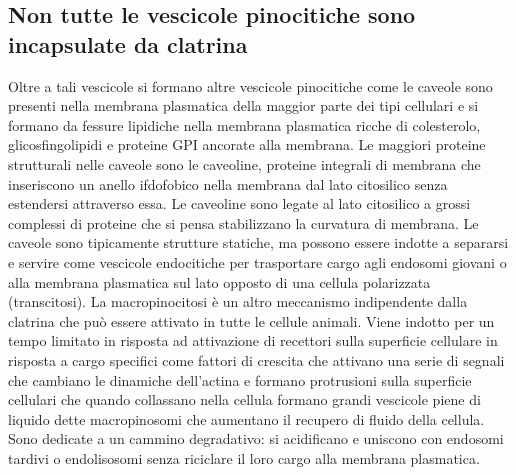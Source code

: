 \subsection{Non tutte le vescicole pinocitiche sono incapsulate da clatrina}
Oltre a tali vescicole si formano altre vescicole pinocitiche come le caveole sono presenti nella membrana plasmatica della maggior parte dei tipi cellulari e si formano da fessure
lipidiche nella membrana plasmatica ricche di colesterolo, glicosfingolipidi e proteine GPI ancorate alla membrana. Le maggiori proteine strutturali nelle caveole sono le caveoline, 
proteine integrali di membrana che inseriscono un anello ifdofobico nella membrana dal lato citosilico senza estendersi attraverso essa. Le caveoline sono legate al lato citosilico
a grossi complessi di proteine che si pensa stabilizzano la curvatura di membrana. Le caveole sono tipicamente strutture statiche, ma possono essere indotte a separarsi e servire come
vescicole endocitiche per trasportare cargo agli endosomi giovani o alla membrana plasmatica sul lato opposto di una cellula polarizzata (transcitosi). La macropinocitosi \`e un
altro meccanismo indipendente dalla clatrina che pu\`o essere attivato in tutte le cellule animali. Viene indotto per un tempo limitato in risposta ad attivazione di recettori sulla
superficie cellulare in risposta a cargo specifici come fattori di crescita che attivano una serie di segnali che cambiano le dinamiche dell'actina e formano protrusioni sulla
superficie cellulari che quando collassano nella cellula formano grandi vescicole piene di liquido dette macropinosomi che aumentano il recupero di fluido della cellula. Sono dedicate a
un cammino degradativo: si acidificano e uniscono con endosomi tardivi o endolisosomi senza riciclare il loro cargo alla membrana plasmatica.
